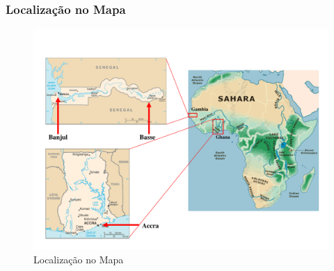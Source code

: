 \begin{frame}
  \frametitle{Localização no Mapa}
  \begin{figure}[H]
    \centering
    \caption{Localização no Mapa}
    \includegraphics[scale=0.3]{../../../inputs/images/zheng/africa_ghana.pdf}
  \end{figure}
\end{frame}

